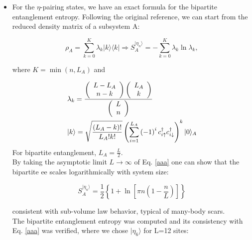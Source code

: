 \documentclass[11pt]{article}
\begin{document}
\begin{itemize}
\begin{itemize}
        \item For the $\eta$-pairing states, we have an exact formula for the bipartite entanglement entropy. Following the original reference, we can start from the reduced density matrix of a subsystem A:
               
        \begin{equation}\label{aaa}
        \rho_A = \sum_{k=0}^{K} \lambda_k |k\rangle \langle k| \Rightarrow S^{|\eta_n\rangle }_A = - \sum_{k=0}^{K} \lambda_k \ln \lambda_k,
        \end{equation}
        
        where $K =\min{\left(n, L_A\right)}$ and
        
        \begin{align}\label{bbb}
        & \lambda_k = \frac{\left( \begin{array}{c} L - L_A \\ n-k \end{array} \right)\left( \begin{array}{c} L_A \\ k \end{array} \right)}{\left( \begin{array}{c} L \\ n \end{array} \right)}\\
        & |k\rangle = \sqrt{\frac{\left( L_A - k \right)!}{L_A!k!}} \left( \sum_{i=1}^{L_A} \left( -1\right)^i c^\dag_{i\uparrow} c^\dag_{i\downarrow} \right)^{\hspace{-0.1mm}k} |0\rangle_{\hspace{-0.1mm}A}
        \end{align}
         For bipartite entanglement, $L_A = \frac{L}{2}$.\\
        By taking the asymptotic limit $L\rightarrow\infty$ of Eq. \eqref{aaa} one can show that the bipartite ee scales logarithmically with system size:
        
        \begin{equation}
         S^{|\eta_n\rangle }_A = \frac{1}{2} \left\{ 1+ \ln \left[ \pi n \left( 1-\frac{n}{L}\right) \right] \right\}
        \end{equation}
        
        consistent with sub-volume law behavior, typical of many-body scars.\\
        The bipartite entanglement entropy was computed and its consistency with Eq. \eqref{aaa} was verified, where we chose $|\eta_6\rangle$ for L=12 sites:
        

\end{itemize}
\end{itemize}
\end{document}
